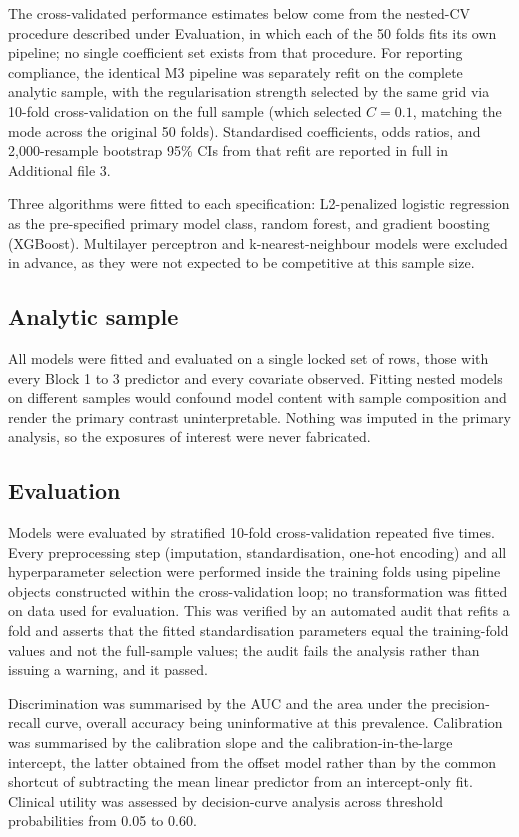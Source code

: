 \documentclass[12pt]{article}
\begin{document}
The cross-validated performance estimates below come from the nested-CV procedure described under Evaluation, in which each of the 50 folds fits its own pipeline; no single coefficient set exists from that procedure. For reporting compliance, the identical M3 pipeline was separately refit on the complete analytic sample, with the regularisation strength selected by the same grid via 10-fold cross-validation on the full sample (which selected $C=0.1$, matching the mode across the original 50 folds). Standardised coefficients, odds ratios, and 2,000-resample bootstrap 95\% CIs from that refit are reported in full in Additional file 3.

Three algorithms were fitted to each specification: L2-penalized logistic regression as the pre-specified primary model class, random forest, and gradient boosting (XGBoost). Multilayer perceptron and k-nearest-neighbour models were excluded in advance, as they were not expected to be competitive at this sample size.

\subsection*{Analytic sample}

All models were fitted and evaluated on a single locked set of rows, those with every Block 1 to 3 predictor and every covariate observed. Fitting nested models on different samples would confound model content with sample composition and render the primary contrast uninterpretable. Nothing was imputed in the primary analysis, so the exposures of interest were never fabricated.

\subsection*{Evaluation}

Models were evaluated by stratified 10-fold cross-validation repeated five times. Every preprocessing step (imputation, standardisation, one-hot encoding) and all hyperparameter selection were performed inside the training folds using pipeline objects constructed within the cross-validation loop; no transformation was fitted on data used for evaluation. This was verified by an automated audit that refits a fold and asserts that the fitted standardisation parameters equal the training-fold values and not the full-sample values; the audit fails the analysis rather than issuing a warning, and it passed.

Discrimination was summarised by the AUC and the area under the precision-recall curve, overall accuracy being uninformative at this prevalence. Calibration was summarised by the calibration slope and the calibration-in-the-large intercept, the latter obtained from the offset model rather than by the common shortcut of subtracting the mean linear predictor from an intercept-only fit. Clinical utility was assessed by decision-curve analysis across threshold probabilities from 0.05 to 0.60.
\end{document}

